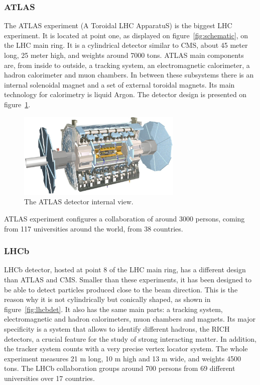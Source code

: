 \subsubsection{ATLAS}
\label{sec:atlas}

The ATLAS experiment (A Toroidal LHC ApparatuS) is the biggest LHC experiment. It is located at point one, as displayed on figure~\ref{fig:schematic}, on the LHC main ring. It is a cylindrical detector similar to CMS, about 45 meter long, 25 meter high, and weights around 7000 tons. ATLAS main components are, from inside to outside, a tracking system, an electromagnetic calorimeter, a hadron calorimeter and muon chambers. In between these subsystems there is an internal solenoidal magnet and a set of external toroidal magnets. Its main technology for calorimetry is liquid Argon. The detector design is presented on figure~\ref{fig:atlasdet}.

\begin{figure}[!Hhtbp]
  \begin{center}
    \includegraphics[width=0.7\textwidth]{figs/atlas_lg.jpg}
    \caption{The ATLAS detector internal view. }
    \label{fig:atlasdet}
  \end{center}
\end{figure}

ATLAS experiment configures a collaboration of around 3000 persons, coming from 117 universities around the world, from 38 countries.

\subsubsection{LHCb}
\label{sec:lhcb}

LHCb detector, hosted at point 8 of the LHC main ring, has a different design than ATLAS and CMS. Smaller than these experiments, it has been designed to be able to detect particles produced close to the beam direction. This is the reason why it is not cylindrically but conically shaped, as shown in figure~\ref{fig:lhcbdet}. It also has the same main parts: a tracking system, electromagnetic and hadron calorimeters, muon chambers and magnets. Its major specificity is a system that allows to identify different hadrons, the RICH detectors, a crucial feature for the study of strong interacting matter. In addition, the tracker system counts with a very precise vertex locator system. The whole experiment measures 21 m long, 10 m high and 13 m wide, and weights 4500 tons. The LHCb collaboration groups around 700 persons from 69 different universities over 17 countries. 

